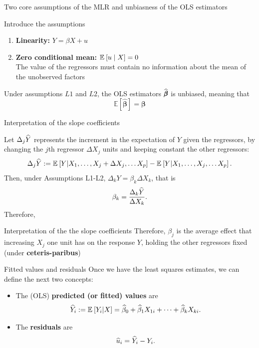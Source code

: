 \documentclass[aspectratio=169]{beamer}
\begin{document}
\begin{frame}{Two core assumptions of the MLR and unbiasness of the OLS estimators}

Introduce the assumptions
\begin{enumerate}    
    \item[L1] \textbf{Linearity:} $Y = \beta X + u$

    \item[L2] \textbf{Zero conditional mean:} $\Esp[u \mid X] = 0$ \\
    The value of the regressors must contain no information about the mean of the unobserved factors
\end{enumerate}

Under assumptions $L1$ and $L2$, the OLS estimators $\widehat{\pmb{\beta}}$ is unbiased, meaning that 
$$
\mathbb{E}[\widehat{\pmb{\beta}}] = \pmb{\beta}
$$

\end{frame}

\begin{frame}{Interpretation of the slope coefficients}

Let $\Delta_j \widehat{Y}$ represents the increment in the expectation of $Y$ given the regressors, by changing the $j$th regressor $\Delta X_j$ units and keeping constant the other regressors:
$$
\Delta_j \what{Y} := 
\Esp[Y | X_1, \dots, X_j + \Delta X_j, \dots X_p] - 
\Esp[Y | X_1, \dots, X_j, \dots X_p].
$$
Then, under Assumptions L1-L2, $\Delta_k Y = \beta_k\Delta X_k$, 
that is
$$
\beta_k = \frac{\Delta_k\widehat{Y}}{\Delta X_k}.
$$
Therefore, 

\begin{coolblock}{Interpretation of the the slope coefficients} 
    Therefore, $\beta_j$ is the average effect that increasing $X_j$ one unit has on the response $Y$, holding the other regressors fixed (under \textbf{ceteris-paribus})
\end{coolblock}

\end{frame}

\begin{frame}{Fitted values and residuals}
Once we have the least squares estimates, we can define the next two concepts:
\vspace{0.3cm}

\begin{itemize}
    \item The (OLS) \textbf{predicted (or fitted) values} are
$$
\what{Y}_i := \Esp[Y_i|X] = \what{\beta}_0 + \what{\beta}_1X_{1i} + \cdots + \what{\beta}_kX_{ki}.
$$

    \item The \textbf{residuals} are
$$
\widehat{u}_i = \widehat{Y}_i - Y_i.
$$
\end{itemize}

\end{frame}
\end{document}
